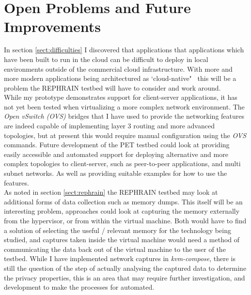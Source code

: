 \documentclass[
    author={Jacob Daniel Halsey},
    supervisor={Prof. Awais Rashid},
    degree={BSc},
    title={Building a Testbed for Evaluating Privacy Enhancing Technologies  (PETs)},
    subtitle={},
    type={software development},
    year={2021}
]{dissertation}
\begin{document}
\section{Open Problems and Future Improvements}

In section \ref{sect:difficulties} I discovered that 
applications that applications which have been built
to run in the cloud can be difficult to deploy in local environments outside of the 
commercial cloud infrastructure. With more and more modern applications being architectured 
as `cloud-native"~\cite{patrizio_2018} this will be a problem the REPHRAIN testbed will have to 
consider and work around. \\

While my prototype demonstrates support for client-server applications, it has not yet been tested
when virtualizing a more complex network environment. 
The \emph{Open vSwitch (OVS)} bridges that I have used to provide the networking features 
are indeed capable of implementing layer 3 routing and more advanced topologies, 
but at present this would require manual configuration using the \emph{OVS} commands.
Future development of the PET testbed could look at providing easily accessible and
automated support 
for deploying alternative and more complex topologies to client-server, such as peer-to-peer 
applications, and multi subnet networks.
As well as providing suitable examples for how to use the features. \\

As noted in section \ref{sect:rephrain} the REPHRAIN testbed may look at additional
forms of data collection such as memory dumps. This itself will be an interesting problem,
approaches could look at capturing the memory externally from the hypervisor, or from within the
virtual machine. Both would have to find a solution of selecting the useful / relevant memory
for the technology being studied, and captures taken inside the virtual machine would need a method
of communicating the data back out of the virtual machine to the user of the testbed.
While I have implemented network captures in \emph{kvm-compose}, there is still the
question of the step of actually analysing the captured data to determine the privacy properties,
this is an area that may require further investigation, and development to make the processes
for automated. \\
\end{document}
